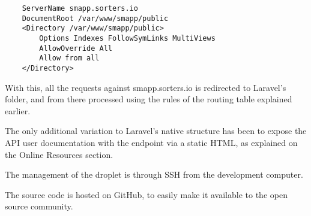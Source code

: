 \begin{verbatim}
	ServerName smapp.sorters.io
	DocumentRoot /var/www/smapp/public
	<Directory /var/www/smapp/public>
		Options Indexes FollowSymLinks MultiViews
		AllowOverride All
		Allow from all
	</Directory>
\end{verbatim}

With this, all the requests against smapp.sorters.io is redirected to Laravel’s  folder, and from there processed using the rules of the routing table explained earlier.

The only additional variation to Laravel’s native structure has been to expose the API user documentation with the  endpoint via a static HTML, as explained on the Online Resources section.

The management of the droplet is through SSH from the development computer.

The source code is hosted on GitHub, to easily make it available to the open source community.